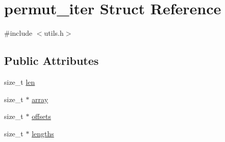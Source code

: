 \hypertarget{structpermut__iter}{\section{permut\-\_\-iter \-Struct \-Reference}
\label{structpermut__iter}
}


{\ttfamily \#include $<$utils.\-h$>$}

\subsection*{\-Public \-Attributes}
\begin{DoxyCompactItemize}
\item 
size\-\_\-t \hyperlink{structpermut__iter_a33e74b5a166138a63700b6b5916c36cb}{len}
\item 
size\-\_\-t $\ast$ \hyperlink{structpermut__iter_a0f17d538587268e87ee958bb52b81e81}{array}
\item 
size\-\_\-t $\ast$ \hyperlink{structpermut__iter_aa3c8cdc4be5fba6e7d7b36f748710706}{offsets}
\item 
size\-\_\-t $\ast$ \hyperlink{structpermut__iter_ad2f6ea38d8e42e8c48a747cf06032032}{lengths}
\end{DoxyCompactItemize}


